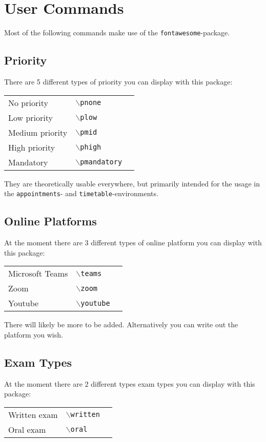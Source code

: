 \documentclass[english]{article}
\newcommand{\cmd}[1]{$\backslash$\texttt{{#1}}}
\begin{document}
	\pagebreak
	\section{User Commands}
	Most of the following commands make use of the \texttt{fontawesome}-package.
	\subsection{Priority}
	\label{priority}
	
	There are 5 different types of priority you can display with this package:
	\begin{center}
		\begin{tabular}{lll}
			No priority&\cmd{pnone}&\pnone\\
			Low priority&\cmd{plow}&\plow\\
			Medium priority&\cmd{pmid}&\pmid\\
			High priority&\cmd{phigh}&\phigh\\
			Mandatory&\cmd{pmandatory}&\pmandatory\\
		\end{tabular}
	\end{center}
	They are theoretically usable everywhere, but primarily intended for the usage in the \texttt{appointments}- and \texttt{timetable}-environments. 

	
	\subsection{Online Platforms}
	\label{online}
	At the moment there are 3 different types of online platform you can display with this package:
	\begin{center}
		\begin{tabular}{lll}
			Microsoft Teams&\cmd{teams}&\teams\\
			Zoom&\cmd{zoom}&\zoom\\
			Youtube&\cmd{youtube}&\youtube\\
		\end{tabular}
	\end{center}
	There will likely be more to be added. Alternatively you can write out the platform you wish.
	
	\subsection{Exam Types}
	\label{examtypes}
	At the moment there are 2 different types exam types you can display with this package:
	\begin{center}
		\begin{tabular}{lll}
			Written exam&\cmd{written}&\written\\
			Oral exam&\cmd{oral}&\oral\\
		\end{tabular}
	\end{center}
\end{document}
